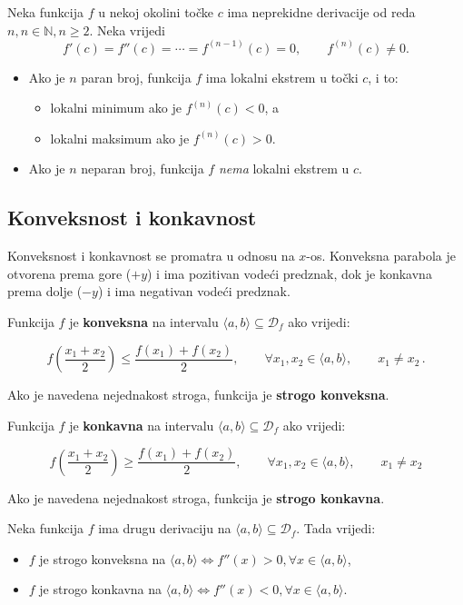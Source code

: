 \begin{theorem}
    Neka funkcija $f$ u nekoj okolini točke $c$ ima neprekidne derivacije od
    reda $n, n\in\mathbb{N},n\geq 2$.
    Neka vrijedi
    $$
    f'(c)=f''(c)=\cdots=f^{(n-1)}(c)=0,\qquad f^{(n)}(c)\neq 0.
    $$

    \begin{itemize}
        \item Ako je $n$ paran broj, funkcija $f$ ima lokalni ekstrem u točki $c$, i to:
        \begin{itemize}
            \item lokalni minimum ako je $f^{(n)}(c)<0$, a
            \item lokalni maksimum ako je $f^{(n)}(c)>0$.
        \end{itemize}
        \item Ako je $n$ neparan broj, funkcija $f$ \textit{nema} lokalni
        ekstrem u $c$.
    \end{itemize}
\end{theorem}

\subsection{Konveksnost i konkavnost}

Konveksnost i konkavnost se promatra u odnosu na $x$-os. Konveksna parabola je
otvorena prema gore ($+y$) i ima pozitivan vodeći predznak, dok je konkavna
prema dolje ($-y$) i ima negativan vodeći predznak.

Funkcija $f$ je \textbf{konveksna} na intervalu $\langle a,b \rangle\subseteq\mathcal{D}_f$
ako vrijedi:

$$
f\left(\frac{x_1+x_2}{2}\right) \leq \frac{f(x_1)+f(x_2)}{2},\qquad\forall x_1,x_2 \in \langle a,b \rangle,\qquad x_1\neq x_2\,.
$$


Ako je navedena nejednakost stroga, funkcija je \textbf{strogo konveksna}.


Funkcija $f$ je \textbf{konkavna} na intervalu $\langle a,b \rangle\subseteq\mathcal{D}_f$
ako vrijedi:

$$
f\left(\frac{x_1+x_2}{2}\right) \geq \frac{f(x_1)+f(x_2)}{2},\qquad\forall x_1,x_2 \in \langle a,b \rangle,\qquad x_1\neq x_2
$$

Ako je navedena nejednakost stroga, funkcija je \textbf{strogo konkavna}.

\begin{theorem}
    Neka funkcija $f$ ima drugu derivaciju na $\langle a,b \rangle\subseteq\mathcal{D}_f$.
    Tada vrijedi:
    \begin{itemize}
        \item $f$ je strogo konveksna na $\langle a,b \rangle \Leftrightarrow f''(x)>0,\forall x \in \langle a,b \rangle$,
        \item $f$ je strogo konkavna na $\langle a,b \rangle \Leftrightarrow f''(x)<0,\forall x \in \langle a,b \rangle$.
    \end{itemize}
\end{theorem}

